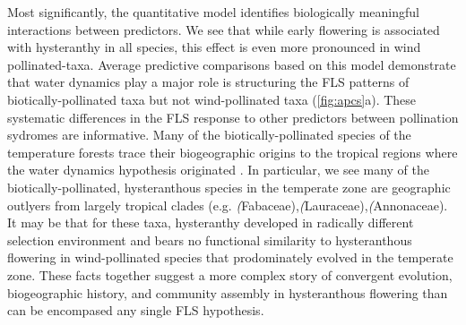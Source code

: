 \documentclass{article}
\begin{document}
Most significantly, the quantitative model identifies biologically meaningful interactions between predictors. We see that while early flowering is associated with hysteranthy in all species, this effect is even more pronounced in wind pollinated-taxa. Average predictive comparisons based on this model demonstrate that water dynamics play a major role is structuring the FLS patterns of biotically-pollinated taxa but not wind-pollinated taxa (\ref{fig:apcs}a). These systematic differences in the FLS response to other predictors between pollination sydromes are informative. Many of the biotically-pollinated species of the temperature forests trace their biogeographic origins to the tropical regions where the water dynamics hypothesis originated \citep{Daubenmire1972}. In particular, we see many of the biotically-pollinated, hysteranthous species in the temperate zone are geographic outlyers from largely tropical clades (e.g. \textit(Fabaceae),\textit(Lauraceae),\textit(Annonaceae). It may be that for these taxa, hysteranthy developed in radically different selection environment and bears no functional similarity to hysteranthous flowering in wind-pollinated species that prodominately evolved in the temperate zone. These facts together suggest a more complex story of convergent evolution, biogeographic history, and community assembly in hysteranthous flowering than can be encompased any single FLS hypothesis.\\
\end{document}
